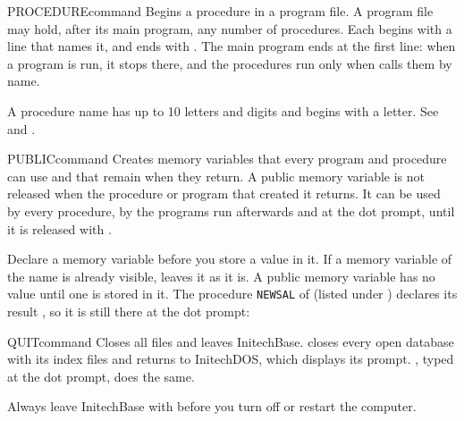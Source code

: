 \begin{XbaseEntry}{PROCEDURE}{command}
Begins a procedure in a program file.
\Syntax
{}
\Usage
A program file may hold, after its main program, any number of procedures.
Each begins with a  line that names it, and ends with
.  The main program ends at the first  line: when a
program is run, it stops there, and the procedures run only when
 calls them by name.

A procedure name has up to 10 letters and digits and begins with a letter.
\Examples
See  and .
\end{XbaseEntry}

\begin{XbaseEntry}{PUBLIC}{command}
Creates memory variables that every program and procedure can use and that
remain when they return.
\Syntax
{}
\Usage
A public memory variable is not released when the procedure or program that
created it returns.  It can be used by every procedure, by the programs run
afterwards and at the dot prompt, until it is released with .

Declare a memory variable  before you store a value in it.  If a
memory variable of the name is already visible,  leaves it as it
is.  A public memory variable has no value until one is stored in it.
\Examples
The procedure \texttt{NEWSAL} of  (listed under )
declares its result , so it is still there at the dot prompt:
\end{XbaseEntry}

\begin{XbaseEntry}{QUIT}{command}
Closes all files and leaves InitechBase.
\Syntax
{}
\Usage
{} closes every open database with its index files and returns to
InitechDOS, which displays its prompt.  , typed at the dot prompt,
does the same.

Always leave InitechBase with  before you turn off or restart the
computer.
\Examples
{}
\end{XbaseEntry}

